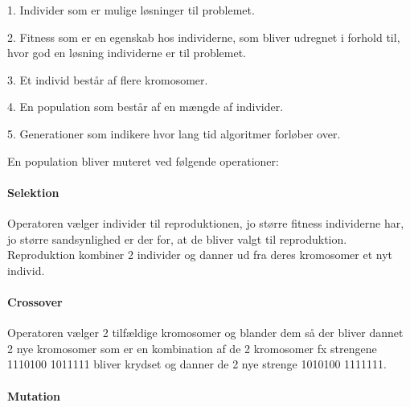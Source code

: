 1.	Individer som er mulige løsninger til problemet.


2.	Fitness som er en egenskab hos individerne, som bliver udregnet i forhold til, hvor god en løsning individerne er til problemet.


3.	Et individ består af flere kromosomer.


4.	En population som består af en mængde af individer.


5.	Generationer som indikere hvor lang tid algoritmer forløber over.


En population bliver muteret ved følgende operationer:

\paragraph{Selektion}

Operatoren vælger individer til reproduktionen, jo større fitness individerne har, jo større sandsynlighed er der for, at de bliver valgt til reproduktion. Reproduktion kombiner 2 individer og danner ud fra deres kromosomer et nyt individ.

\paragraph{Crossover}

Operatoren vælger 2 tilfældige kromosomer og blander dem så der bliver dannet 2 nye kromosomer som er en kombination af de 2 kromosomer fx strengene 1110100 1011111 bliver krydset og danner de 2 nye strenge 1010100 1111111.

\paragraph{Mutation}

